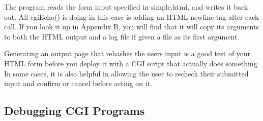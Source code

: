 The program reads the form input specified in \textsf{simple.html}, and
writes it back out. All \textsf{cgiEcho()} is doing in this case is
adding an HTML newline tag after each call. If you look it up in
Appendix B, you will find that it will copy its arguments to both the
HTML output and a log file if given a file as its first argument.


Generating an output page that rehashes the user{\textquotesingle}s
input is a good test of your HTML form before you deploy it with a CGI
script that actually does something. In some cases, it is also helpful
in allowing the user to recheck their submitted input and confirm or
cancel before acting on it.

\subsection{Debugging CGI Programs}


